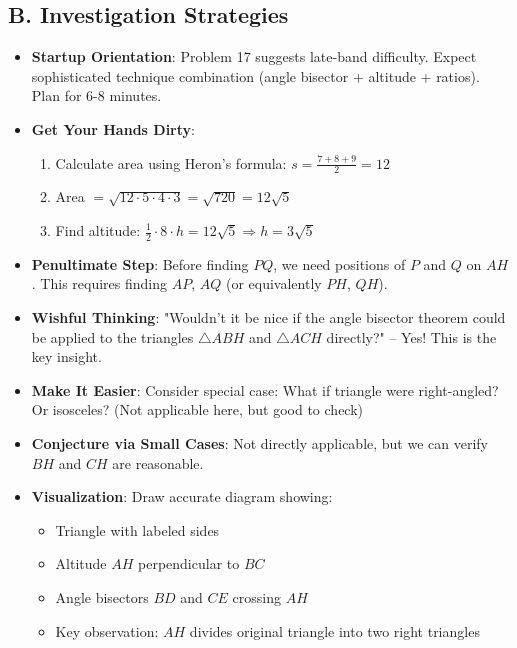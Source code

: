 \documentclass[12pt]{article}
\begin{document}
\begin{strategicbox}
\subsection*{B. Investigation Strategies}
\begin{itemize}[leftmargin=*]
    \item \textbf{Startup Orientation}: Problem 17 suggests late-band difficulty. Expect sophisticated technique combination (angle bisector + altitude + ratios). Plan for 6-8 minutes.
    \item \textbf{Get Your Hands Dirty}: 
    \begin{enumerate}
        \item Calculate area using Heron's formula: $s = \frac{7+8+9}{2} = 12$
        \item Area $= \sqrt{12 \cdot 5 \cdot 4 \cdot 3} = \sqrt{720} = 12\sqrt{5}$
        \item Find altitude: $\frac{1}{2} \cdot 8 \cdot h = 12\sqrt{5} \Rightarrow h = 3\sqrt{5}$
    \end{enumerate}
    \item \textbf{Penultimate Step}: Before finding $PQ$, we need positions of $P$ and $Q$ on $AH$. This requires finding $AP$, $AQ$ (or equivalently $PH$, $QH$).
    \item \textbf{Wishful Thinking}: "Wouldn't it be nice if the angle bisector theorem could be applied to the triangles $\triangle ABH$ and $\triangle ACH$ directly?" -- Yes! This is the key insight.
    \item \textbf{Make It Easier}: Consider special case: What if triangle were right-angled? Or isosceles? (Not applicable here, but good to check)
    \item \textbf{Conjecture via Small Cases}: Not directly applicable, but we can verify $BH$ and $CH$ are reasonable.
    \item \textbf{Visualization}: Draw accurate diagram showing:
    \begin{itemize}
        \item Triangle with labeled sides
        \item Altitude $AH$ perpendicular to $BC$
        \item Angle bisectors $BD$ and $CE$ crossing $AH$
        \item Key observation: $AH$ divides original triangle into two right triangles
    \end{itemize}
\end{itemize}


\end{strategicbox}
\end{document}
